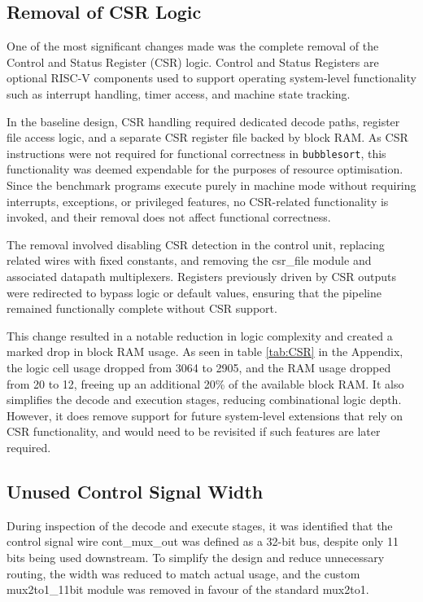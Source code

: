 \documentclass[a4paper,10pt]{article}
\begin{document}
\subsection{Removal of CSR Logic}
\label{sec:CSR}

One of the most significant changes made was the complete removal of the 
Control and Status Register (CSR) logic. 
Control and Status Registers are optional RISC-V components used to 
support operating system-level functionality such as 
interrupt handling, timer access, and machine state tracking.

In the baseline design, CSR handling required dedicated decode paths, 
register file access logic, and a separate CSR register file backed by block RAM. 
As CSR instructions were not required for functional correctness in \texttt{bubblesort}, 
this functionality was deemed expendable for the purposes of resource optimisation.
Since the benchmark programs execute purely in machine mode without 
requiring interrupts, exceptions, or privileged features, 
no CSR-related functionality is invoked, 
and their removal does not affect functional correctness.

The removal involved disabling CSR detection in the control unit, 
replacing related wires with fixed constants, and removing the csr\_file module 
and associated datapath multiplexers. 
Registers previously driven by CSR outputs were redirected to bypass logic 
or default values, ensuring that the pipeline remained functionally complete 
without CSR support.

This change resulted in a notable reduction in logic complexity and 
created a marked drop in block RAM usage. 
As seen in table \ref{tab:CSR} in the Appendix,
the logic cell usage dropped from 3064 to 2905, 
and the RAM usage dropped from 20 to 12,
freeing up an additional 20\% of the available block RAM.
It also simplifies the decode and 
execution stages, reducing combinational logic depth. 
However, it does remove support for future system-level extensions 
that rely on CSR functionality, and would need to be revisited if 
such features are later required.

\subsection{Unused Control Signal Width}
\label{sec:Signal_Width}

During inspection of the decode and execute stages, 
it was identified that the control signal wire cont\_mux\_out 
was defined as a 32-bit bus, despite only 11 bits being used downstream. 
To simplify the design and reduce unnecessary routing, 
the width was reduced to match actual usage, 
and the custom mux2to1\_11bit module was removed in favour of the standard mux2to1.
\end{document}
